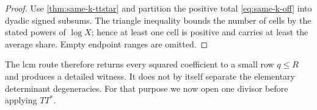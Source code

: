 \begin{proof}
Use \cref{thm:same-k-ttstar} and partition the positive total
\eqref{eq:same-k-off} into dyadic signed subsums.  The triangle
inequality bounds the number of cells by the stated powers of
$\log X$; hence at least one cell is positive and carries at least the
average share.  Empty endpoint ranges are omitted.
\end{proof}

The lcm route therefore returns every squared coefficient to a small
row $q\le R$ and produces a detailed witness.  It does not by itself
separate the elementary determinant degeneracies.  For that purpose we
now open one divisor before applying $TT^*$.
